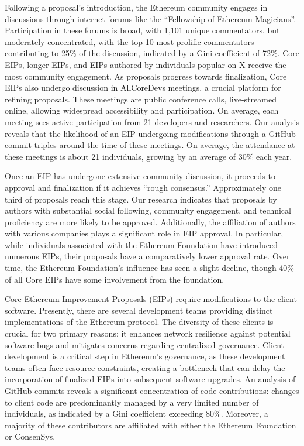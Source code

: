 \documentclass[No]{AEA}
\begin{document}
Following a proposal's introduction, the Ethereum community engages in discussions through internet forums like the ``Fellowship of Ethereum Magicians''. Participation in these forums is broad, with 1,101 unique commentators, but moderately concentrated,  with the top 10 most prolific commentators contributing to 25\% of the discussion, indicated by a Gini coefficient of 72\%. Core EIPs, longer EIPs, and EIPs authored by individuals popular on X receive the most community engagement. As proposals progress towards finalization, Core EIPs also undergo discussion in AllCoreDevs meetings, a crucial platform for refining proposals. These meetings are public conference calls, live-streamed online, allowing widespread accessibility and participation. On average, each meeting sees active participation from 21 developers and researchers. Our analysis reveals that the likelihood of an EIP undergoing modifications through a GitHub commit triples around the time of these meetings. On average, the attendance at these meetings is about 21 individuals, growing by an average of 30\% each year.

Once an EIP has undergone extensive community discussion, it proceeds to approval and finalization if it achieves ``rough consensus.'' Approximately one third of proposals reach this stage. Our research indicates that proposals by authors with substantial social following, community engagement, and technical proficiency are more likely to be approved. Additionally, the affiliation of authors with various companies plays a significant role in EIP approval. In particular, while individuals associated with the Ethereum Foundation have introduced numerous EIPs, their proposals have a comparatively lower approval rate. Over time, the Ethereum Foundation's influence has seen a slight decline, though 40\% of all Core EIPs have some involvement from the foundation. 

Core Ethereum Improvement Proposals (EIPs) require modifications to the client software. Presently, there are several development teams providing distinct implementations of the Ethereum protocol. The diversity of these clients is crucial for two primary reasons: it enhances network resilience against potential software bugs and mitigates concerns regarding centralized governance. Client development is a critical step in Ethereum's governance, as these development teams often face resource constraints, creating a bottleneck that can delay the incorporation of finalized EIPs into subsequent software upgrades. An analysis of GitHub commits reveals a significant concentration of code contributions: changes to client code are predominantly managed by a very limited number of individuals, as indicated by a Gini coefficient exceeding 80\%. Moreover, a majority of these contributors are affiliated with either the Ethereum Foundation or ConsenSys.
\end{document}
